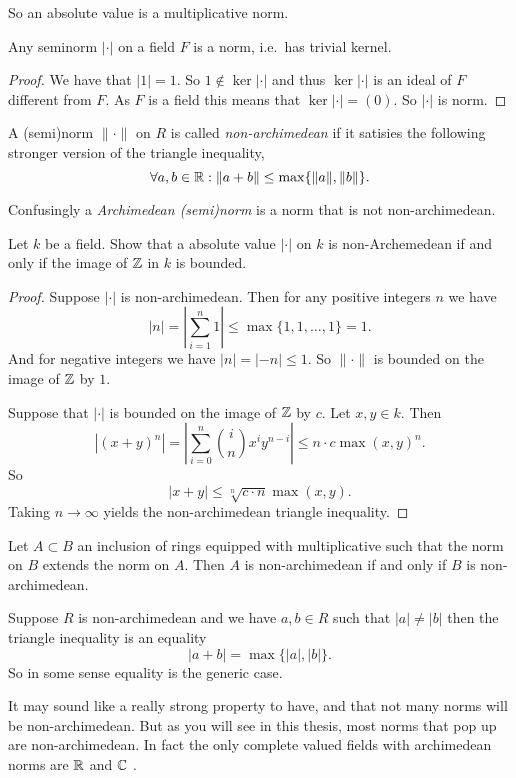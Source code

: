 So an absolute value is a multiplicative norm. 

\begin{lemma}
	Any seminorm $|\cdot |$ on a field $F$ is a norm, i.e.\ has trivial kernel. 
\end{lemma}
\begin{proof}
	We have that $|1| = 1$. So $1 \not\in \ker |\cdot |$ and thus $\ker |\cdot |$ is an ideal of $F$ different from $F$. 
	As $F$ is a field this means that $\ker |\cdot | = (0)$. So $|\cdot |$ is norm. 
\end{proof}

\begin{definition}
	A (semi)norm $\|\cdot \|$ on $R$ is called \emph{non-archimedean} if it satisies the following stronger version of the triangle inequality, \[
	\forall a, b \in \mathbb{R}: \|a + b\| \le \max \{\|a\|, \|b\|\} 
	.\] 

	Confusingly a \emph{Archimedean (semi)norm} is a norm that is not non-archimedean.
\end{definition}

\begin{exercise}
	Let $k$ be a field.
	Show that a absolute value  $|\cdot |$ on $k$ is non-Archemedean if and only if the image of $\mathbb{Z}$ in $k$ is bounded. 
\end{exercise}
\begin{proof}
	Suppose $|\cdot |$ is non-archimedean. Then for any positive integers $n$ we have \[
	|n| = \left|\sum_{i = 1}^{n} 1 \right| \le \max \{1, 1, \ldots, 1\}  = 1
	.\] 
	And for negative integers we have $|n| = |-n| \le 1$. So $\|\cdot \|$ is bounded on the image of $\mathbb{Z}$ by $1$. 


	Suppose that $|\cdot |$ is bounded on the image of $\mathbb{Z}$ by $c$. 
	Let $x, y \in k$. Then \[
		|(x + y)^{n}| = \left| \sum_{i = 0}^{n} \binom{i}{n} x ^{i} y ^{n-i}\right| \le n\cdot c \max(x, y)^{n}
	.\] 
	So \[
		|x + y| \le \sqrt[n]{c\cdot n}  \max(x, y)
	.\] 
	Taking $n \to \infty$ yields the non-archimedean triangle inequality. 
\end{proof}

\begin{corollary}
	Let $A \subset  B$ an inclusion of rings  equipped with multiplicative such that the norm on $B$ extends the norm on $A$. 
	Then $A$ is non-archimedean if and only if $B$ is non-archimedean. 
\end{corollary}

\begin{remark}
	Suppose $R$ is non-archimedean and we have $a, b \in R$ such that $|a| \ne |b|$ then the triangle inequality is an equality \[
	|a + b| = \max \{|a|, |b|\} 
	.\] 
	So in some sense equality is the generic case. 
\end{remark}
It may sound like a really strong property to have, and that not many norms will be non-archimedean. 
But as you will see in this thesis, most norms that pop up are non-archimedean. 
In fact the only complete valued fields with archimedean norms are $\mathbb{R}$ and $\mathbb{C}$ .



